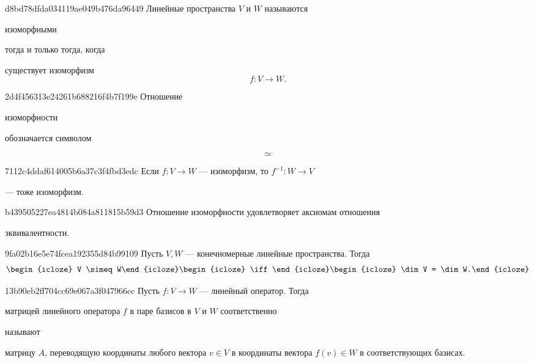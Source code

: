 \begin{note}{d8bd78dfda034119ae049b476da96449}
    Линейные пространства \( V \) и \( W \) называются \begin{icloze}{1}и\-зо\-мор\-фны\-ми\end{icloze} тогда и только тогда, когда \begin{icloze}{2}
        существует изоморфизм
        \[
            f : V \to W.
        \]
    \end{icloze}
\end{note}

\begin{note}{2d4f456313e24261b688216f4b7f199e}
    Отношение \begin{icloze}{2}изоморфности\end{icloze} обозначается символом \begin{icloze}{1}
        \[
            \simeq
        \]
    \end{icloze}
\end{note}

\begin{note}{7112c4ddaf614005b6a37c3f4fbd3edc}
    Если \( f : V \to W \) --- изоморфизм, то \( f^{-1} : W \to V \) \begin{icloze}{1}--- тоже изоморфизм.\end{icloze}
\end{note}

\begin{note}{b439505227ea4814b084a811815b59d3}
    Отношение изоморфности удовлетворяет аксиомам отношения \begin{icloze}{1}эквивалентности.\end{icloze}
\end{note}

\begin{note}{9fa02b16e5e74fcea192355d84b99109}
    Пусть \( V, W \) --- конечномерные линейные пространства. Тогда
    \[
        \begin{icloze}{2}V \simeq W\end{icloze} \begin{icloze}{3}\iff\end{icloze} \begin{icloze}{1}\dim V = \dim W.\end{icloze}
    \]
\end{note}

\begin{note}{13b90eb2ff704cc69e067a3f047966cc}
    Пусть \( f : V \to W \) --- линейный оператор. Тогда \begin{icloze}{2}матрицей линейного оператора \( f \) в паре базисов в \( V \) и \( W \) со\-от\-вет\-ствен\-но\end{icloze} называют \begin{icloze}{1}матрицу \( A \), переводящую координаты любого вектора \( v \in V \) в координаты вектора \( f(v) \in W \) в соответствующих базисах.\end{icloze}
\end{note}

